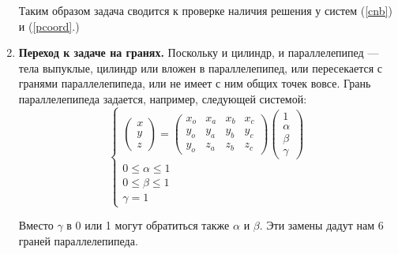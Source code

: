 \documentclass[pdftex,ptm,12pt,a4paper]{report}
\begin{document}
\begin{enumerate}
      Таким образом задача сводится к проверке наличия решения у систем (\ref{cnb}) и (\ref{pcoord}.)
  \item
    \textbf{Переход к задаче на гранях.}
    Поскольку и цилиндр, и параллелепипед --- тела выпуклые, цилиндр или вложен в параллелепипед, или пересекается с гранями параллелепипеда, или не имеет с ним общих точек вовсе.
    Грань параллелепипеда задается, например, следующей системой:
    \begin{equation}\label{planecoord}
      \begin{cases}
        \begin{pmatrix} x \\ y \\ z \end{pmatrix}            
        =
        \begin{pmatrix} x_o & x_a & x_b & x_c \\ y_o & y_a & y_b & y_c  \\ y_o & z_a & z_b & z_c 
        \end{pmatrix} \begin {pmatrix} 1 \\ \alpha \\ \beta \\ \gamma \end{pmatrix} \\
        0 \le  \alpha   \le  1 \\
        0 \le  \beta   \le  1 \\
        \gamma   =  1 
      \end{cases}
    \end{equation}

    Вместо $\gamma$ в 0 или 1 могут обратиться также $\alpha$ и $\beta$.
    Эти замены дадут нам 6 граней параллелепипеда.


\end{enumerate}
\end{document}

